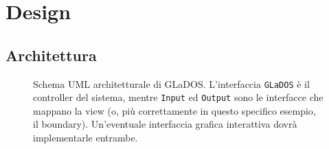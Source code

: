 \documentclass[a4paper,12pt]{report}
\begin{document}
\chapter{Design}

\section{Architettura}


\begin{figure}[h]
\centering{}
\caption{Schema UML architetturale di GLaDOS. L'interfaccia \texttt{GLaDOS} è il controller del sistema, mentre \texttt{Input} ed \texttt{Output} sono le interfacce che mappano la view (o, più correttamente in questo specifico esempio, il boundary). Un'eventuale interfaccia grafica interattiva dovrà implementarle entrambe.}
\label{img:goodarch}
\end{figure}

\end{document}
